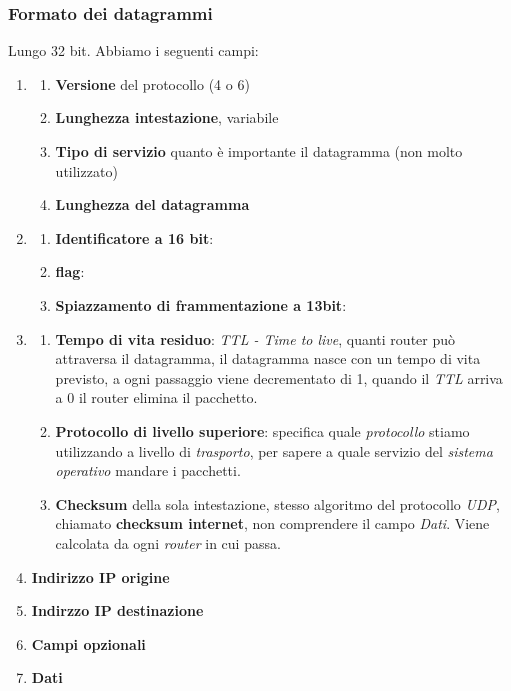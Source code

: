 \subsubsection{Formato dei datagrammi}
Lungo 32 bit. Abbiamo i seguenti campi:
\begin{enumerate}
  \item \begin{enumerate}
      \item \textbf{Versione} del protocollo (4 o 6)
      \item \textbf{Lunghezza intestazione}, variabile 
      \item \textbf{Tipo di servizio} quanto è importante il datagramma (non molto utilizzato)
      \item \textbf{Lunghezza del datagramma}
  \end{enumerate}
  \item \begin{enumerate}
      \item \textbf{Identificatore a 16 bit}: 
      \item \textbf{flag}:
      \item \textbf{Spiazzamento di frammentazione a 13bit}:
  \end{enumerate}
  \item \begin{enumerate}
      \item \textbf{Tempo di vita residuo}: \textit{TTL - Time to live}, quanti router può attraversa il datagramma, il datagramma nasce con un tempo di vita previsto, a ogni passaggio viene decrementato di 1, quando il \textit{TTL} arriva a 0 il router elimina il pacchetto.  
      \item \textbf{Protocollo di livello superiore}: specifica quale \textit{protocollo} stiamo utilizzando a livello di \textit{trasporto}, per sapere a quale servizio del \textit{sistema operativo} mandare i pacchetti.
      \item \textbf{Checksum} della sola intestazione, stesso algoritmo del protocollo \textit{UDP}, chiamato \textbf{checksum internet}, non comprendere il campo \textit{Dati}. Viene calcolata da ogni \textit{router} in cui passa. 
  \end{enumerate}
  \item \textbf{Indirizzo IP origine}
  \item \textbf{Indirzzo IP destinazione}
  \item \textbf{Campi opzionali}
  \item \textbf{Dati}
\end{enumerate}

